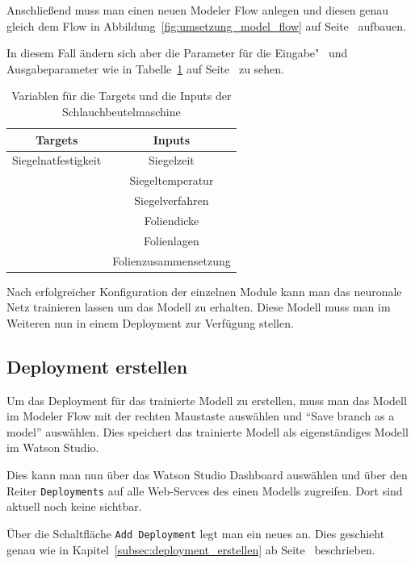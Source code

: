 Anschließend muss man einen neuen Modeler Flow anlegen und diesen genau gleich dem Flow in
Abbildung~\ref{fig:umsetzung_model_flow} auf Seite~\pageref{fig:umsetzung_model_flow} aufbauen.

In diesem Fall ändern sich aber die Parameter für die Eingabe"~ und Ausgabeparameter wie in
Tabelle~\ref{tab:targets_inputs_siegeln} auf Seite~\pageref{tab:targets_inputs_siegeln} zu sehen.

\begin{table}[h]
    \centering
    \begin{tabular}{|c|c|}
        \hline
        \textbf{Targets} & \textbf{Inputs}\\
        \hline
        \hline
        Siegelnatfestigkeit & Siegelzeit\\
        \hline
        & Siegeltemperatur\\
        \hline
        & Siegelverfahren\\
        \hline
        & Foliendicke\\
        \hline
        & Folienlagen\\
        \hline
        & Folienzusammensetzung\\
        \hline
    \end{tabular}
    \caption{Variablen für die Targets und die Inputs der Schlauchbeutelmaschine}
    \label{tab:targets_inputs_siegeln}
\end{table}

Nach erfolgreicher Konfiguration der einzelnen Module kann man das neuronale Netz trainieren lassen um das Modell zu
erhalten. Diese Modell muss man im Weiteren nun in einem Deployment zur Verfügung stellen.

\subsection{Deployment erstellen}
Um das Deployment für das trainierte Modell zu erstellen, muss man das Modell im Modeler Flow mit der rechten Maustaste
auswählen und \enquote{Save branch as a model} auswählen. Dies speichert das trainierte Modell als eigenständiges Modell
im Watson Studio.

Dies kann man nun über das Watson Studio Dashboard auswählen und über den Reiter \texttt{Deployments} auf alle
Web-Servces des einen Modells zugreifen. Dort sind aktuell noch keine sichtbar.

Über die Schaltfläche \texttt{Add Deployment} legt man ein neues an. Dies geschieht genau wie in
Kapitel~\ref{subsec:deployment_erstellen} ab Seite~\pageref{subsec:deployment_erstellen} beschrieben.

